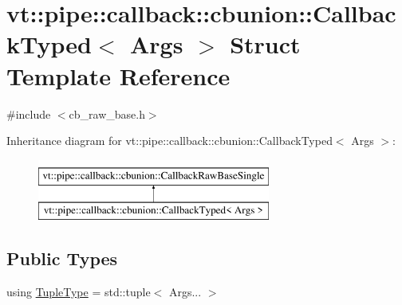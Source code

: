 \hypertarget{structvt_1_1pipe_1_1callback_1_1cbunion_1_1_callback_typed}{}\section{vt\+:\+:pipe\+:\+:callback\+:\+:cbunion\+:\+:Callback\+Typed$<$ Args $>$ Struct Template Reference}
\label{structvt_1_1pipe_1_1callback_1_1cbunion_1_1_callback_typed}


{\ttfamily \#include $<$cb\+\_\+raw\+\_\+base.\+h$>$}

Inheritance diagram for vt\+:\+:pipe\+:\+:callback\+:\+:cbunion\+:\+:Callback\+Typed$<$ Args $>$\+:\begin{figure}[H]
\begin{center}
\leavevmode
\includegraphics[height=2.000000cm]{structvt_1_1pipe_1_1callback_1_1cbunion_1_1_callback_typed}
\end{center}
\end{figure}
\subsection*{Public Types}
\begin{DoxyCompactItemize}
\item 
using \hyperlink{structvt_1_1pipe_1_1callback_1_1cbunion_1_1_callback_typed_ae236a8bcffe928ee956fbd9df57181d3}{Tuple\+Type} = std\+::tuple$<$ Args... $>$
\end{DoxyCompactItemize}
